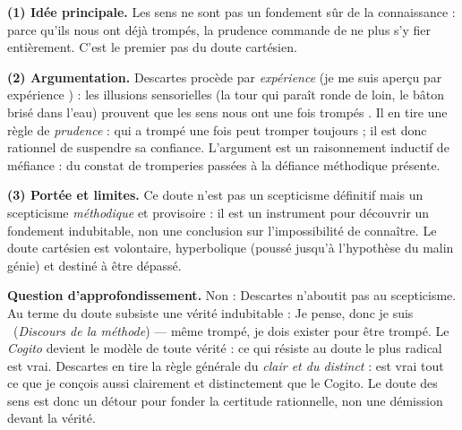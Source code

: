 \documentclass[11pt]{article}
\begin{document}
\begin{corrige}
\textbf{(1) Idée principale.} Les sens ne sont pas un fondement sûr de la connaissance : parce qu'ils nous ont déjà trompés, la prudence commande de ne plus s'y fier entièrement. C'est le premier pas du doute cartésien.

\textbf{(2) Argumentation.} Descartes procède par \emph{expérience} (\guillemotleft je me suis aperçu par expérience \guillemotright) : les illusions sensorielles (la tour qui paraît ronde de loin, le bâton brisé dans l'eau) prouvent que les sens nous ont \guillemotleft une fois trompés \guillemotright. Il en tire une règle de \emph{prudence} : qui a trompé une fois peut tromper toujours ; il est donc rationnel de suspendre sa confiance. L'argument est un raisonnement inductif de méfiance : du constat de tromperies passées à la défiance méthodique présente.

\textbf{(3) Portée et limites.} Ce doute n'est pas un scepticisme définitif mais un scepticisme \emph{méthodique} et provisoire : il est un instrument pour découvrir un fondement indubitable, non une conclusion sur l'impossibilité de connaître. Le doute cartésien est volontaire, hyperbolique (poussé jusqu'à l'hypothèse du malin génie) et destiné à être dépassé.

\textbf{Question d'approfondissement.} Non : Descartes n'aboutit pas au scepticisme. Au terme du doute subsiste une vérité indubitable : \guillemotleft Je pense, donc je suis \guillemotright\ (\emph{Discours de la méthode}) — même trompé, je dois exister pour être trompé. Le \emph{Cogito} devient le modèle de toute vérité : ce qui résiste au doute le plus radical est vrai. Descartes en tire la règle générale du \emph{clair et du distinct} : est vrai tout ce que je conçois aussi clairement et distinctement que le Cogito. Le doute des sens est donc un détour pour fonder la certitude rationnelle, non une démission devant la vérité.
\end{corrige}
\end{document}
